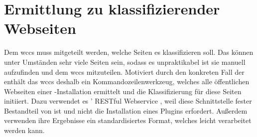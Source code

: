 \section{Ermittlung zu klassifizierender Webseiten}
    \label{section:conceptCrawler}
    Dem \gls{wccs} muss mitgeteilt werden, welche Seiten es klassifizieren soll.
    Das können unter Umständen sehr viele Seiten sein,
    sodass es unpraktikabel ist sie manuell aufzufinden
    und dem \gls{wccs} mitzuteilen.
    Motiviert durch den konkreten Fall der {\fernUni} enthält das \gls{wccs}
    deshalb ein Kommandozeilenwerkzeug, welches alle öffentlichen Webseiten einer
    {\wordpress}-Installation ermittelt und die Klassifizierung für diese Seiten initiiert.
    Dazu verwendet es {\wordpress}' RESTful Webservice \cite[Kapitel "`REST API Handbook"']{wordpress:codex},
    weil diese Schnittstelle fester Bestandteil von {\wordpress} ist und nicht die
    Installation eines Plugins erfordert.
    Außerdem verwenden ihre Ergebnisse ein standardisiertes Format,
    welches leicht verarbeitet werden kann.
